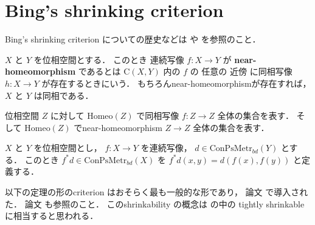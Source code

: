 \documentclass[leqno, a4paper, 12pt]{jsarticle}
\numberwithin{equation}{section}
\newcommand{\yomapl}[2]{\mathrm{C}(#1, #2)}
\newcommand{\yocbmet}[1]{\mathrm{ConPsMetr}_{bd}(#1)}
\newcommand{\yomaphset}[1]{\mathrm{Homeo}(#1)}
\begin{document}
\section{Bing's shrinking criterion}
Bing's shrinking criterion 
についての歴史などは
\cite{McAuley1979SHRINKABLEDC}
や
\cite{arXiv:2103.02977}
を参照のこと．

$X$
と
$Y$
を位相空間とする．
このとき
連続写像
$f\colon X\to Y$
が
\textbf{near-homeomorphism}
であるとは
$\yomapl{X}{Y}$
内の
$f$
の
任意の
近傍
に同相写像
$h\colon X\to Y$
が存在するときにいう．
もちろんnear-homeomorphismが存在すれば，
$X$
と
$Y$
は同相である．


位相空間
$Z$
に対して
$\yomaphset{Z}$
で同相写像
$f\colon Z\to Z$
全体の集合を表す．
そして
$\yomaphset{Z}$
でnear-homeomorphism
$Z\to Z$
全体の集合を表す．


$X$
と
$Y$
を位相空間とし，
$f\colon X\to Y$
を連続写像，
$d\in \yocbmet{Y}$
とする．
このとき
$f^{*}d\in \yocbmet{X}$
を
$f^{*}d(x, y)=d(f(x), f(y))$
と定義する．

以下の定理の形のcriterion
はおそらく最も一般的な形であり，
論文
\cite{zbMATH03734780}
で導入された．
論文
\cite{zbMATH03932021}
も参照のこと．
このshrinkability
の概念は
\cite{McAuley1979SHRINKABLEDC}
の中の
tightly shrinkable
に相当すると思われる．
\end{document}
